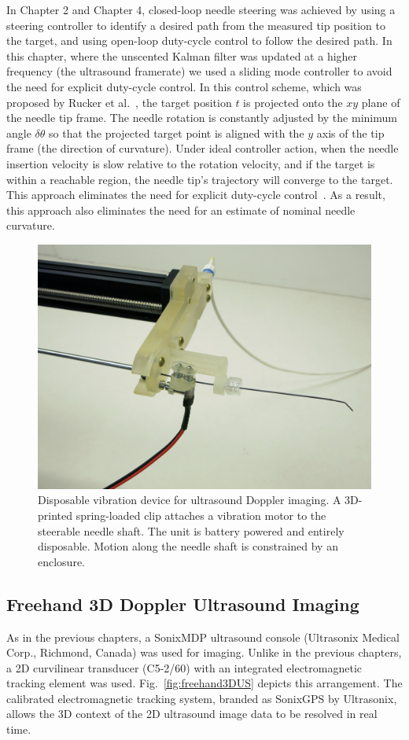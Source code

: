 In Chapter 2 and Chapter 4, closed-loop needle steering was achieved by using a steering controller to identify a desired path from the measured tip position to the target, and using open-loop duty-cycle control to follow the desired path. In this chapter, where the unscented Kalman filter was updated at a higher frequency (the ultrasound framerate) we used a sliding mode controller to avoid the need for explicit duty-cycle control. In this control scheme, which was proposed by Rucker et al.~\cite{Rucker2013}, the target position $t$ is projected onto the $xy$ plane of the needle tip frame. The needle rotation is constantly adjusted by the minimum angle $\delta\theta$ so that the projected target point is aligned with the $y$ axis of the tip frame (the direction of curvature). Under ideal controller action, when the needle insertion velocity is slow relative to the rotation velocity, and if the target is within a reachable region, the needle tip's trajectory will converge to the target. This approach eliminates the need for explicit duty-cycle control~\cite{Minhas2007}. As a result, this approach also eliminates the need for an estimate of nominal needle curvature. 

\begin{figure}[!t]
\centering
\includegraphics[width = 0.6\columnwidth]{./Images/Chapter5/Buzzer/Buzzer.jpg}%
\caption[Disposable vibration device]{Disposable vibration device for ultrasound Doppler imaging. A 3D-printed spring-loaded clip attaches a vibration motor to the steerable needle shaft. The unit is battery powered and entirely disposable. Motion along the needle shaft is constrained by an enclosure.}
\label{fig:Buzzer}
\end{figure}  

\subsection{Freehand 3D Doppler Ultrasound Imaging}
As in the previous chapters, a SonixMDP ultrasound console (Ultrasonix Medical Corp., Richmond, Canada) was used for imaging. Unlike in the previous chapters, a 2D curvilinear transducer (C5-2/60) with an integrated electromagnetic tracking element was used. Fig.~\ref{fig:freehand3DUS} depicts this arrangement. The calibrated electromagnetic tracking system, branded as SonixGPS by Ultrasonix, allows the 3D context of the 2D ultrasound image data to be resolved in real time. 

